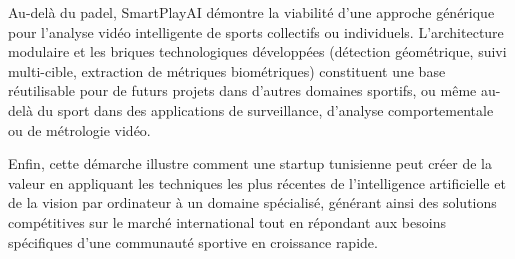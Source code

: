 Au-delà du padel, SmartPlayAI démontre la viabilité d'une approche générique pour l'analyse vidéo intelligente de sports collectifs ou individuels. L'architecture modulaire et les briques technologiques développées (détection géométrique, suivi multi-cible, extraction de métriques biométriques) constituent une base réutilisable pour de futurs projets dans d'autres domaines sportifs, ou même au-delà du sport dans des applications de surveillance, d'analyse comportementale ou de métrologie vidéo.

Enfin, cette démarche illustre comment une startup tunisienne peut créer de la valeur en appliquant les techniques les plus récentes de l'intelligence artificielle et de la vision par ordinateur à un domaine spécialisé, générant ainsi des solutions compétitives sur le marché international tout en répondant aux besoins spécifiques d'une communauté sportive en croissance rapide.
